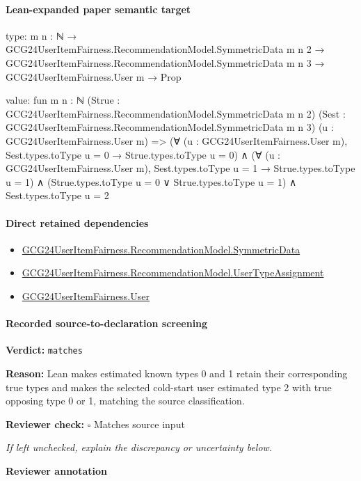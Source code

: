 \documentclass[10pt]{article}
\newcommand{\reviewerbox}{%
  \par\noindent\fbox{\parbox{0.96\linewidth}{\rule{0pt}{0.38in}}}\par
}
\newcommand{\reviewmatch}[1]{%
  \par\noindent\textbf{Reviewer check:} $\square$\; #1\par
  \noindent\emph{If left unchecked, explain the discrepancy or uncertainty below.}\par
}
\begin{document}
\paragraph{Lean-expanded paper semantic target}
\begin{ReviewVerbatim}
type:
{m n : ℕ} →
  GCG24UserItemFairness.RecommendationModel.SymmetricData m n 2 →
    GCG24UserItemFairness.RecommendationModel.SymmetricData m n 3 → GCG24UserItemFairness.User m → Prop

value:
fun {m n : ℕ} (Strue : GCG24UserItemFairness.RecommendationModel.SymmetricData m n 2)
    (Sest : GCG24UserItemFairness.RecommendationModel.SymmetricData m n 3) (u : GCG24UserItemFairness.User m) =>
  (∀ (u : GCG24UserItemFairness.User m), Sest.types.toType u = 0 → Strue.types.toType u = 0) ∧
    (∀ (u : GCG24UserItemFairness.User m), Sest.types.toType u = 1 → Strue.types.toType u = 1) ∧
      (Strue.types.toType u = 0 ∨ Strue.types.toType u = 1) ∧ Sest.types.toType u = 2
\end{ReviewVerbatim}

\paragraph{Direct retained dependencies}
\begin{itemize}\raggedright
\item \hyperlink{governing-declaration-5bf2c3489c614d0a}{GCG24\allowbreak{}User\allowbreak{}Item\allowbreak{}Fairness.\allowbreak{}Recommendation\allowbreak{}Model.\allowbreak{}Symmetric\allowbreak{}Data}
\item \hyperlink{governing-declaration-ff90b1efab93f1aa}{GCG24\allowbreak{}User\allowbreak{}Item\allowbreak{}Fairness.\allowbreak{}Recommendation\allowbreak{}Model.\allowbreak{}User\allowbreak{}Type\allowbreak{}Assignment}
\item \hyperlink{governing-declaration-800dd691bc989470}{GCG24\allowbreak{}User\allowbreak{}Item\allowbreak{}Fairness.\allowbreak{}User}
\end{itemize}
\paragraph{Recorded source-to-declaration screening}
\textbf{Verdict:} \texttt{matches}
\\
{\raggedright
\textbf{Reason:} Lean makes estimated known types 0 and 1 retain their corresponding true types and makes the selected cold-\allowbreak{}start user estimated type 2 with true opposing type 0 or 1, matching the source classification.\allowbreak{}
\par}
\reviewmatch{Matches source input}
\noindent\textbf{Reviewer annotation}\par
\reviewerbox
\clearpage
\hypertarget{paper-prerequisite-6860c3bea7a62ee3}{}
\end{document}
